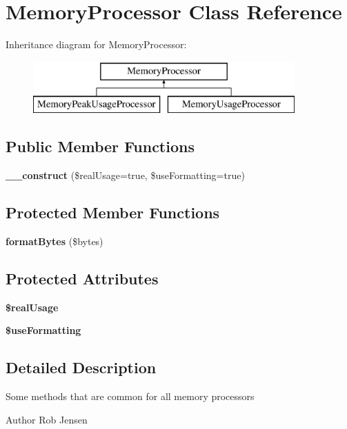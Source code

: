 \section{Memory\+Processor Class Reference}
\label{class_monolog_1_1_processor_1_1_memory_processor}
Inheritance diagram for Memory\+Processor\+:\begin{figure}[H]
\begin{center}
\leavevmode
\includegraphics[height=2.000000cm]{class_monolog_1_1_processor_1_1_memory_processor}
\end{center}
\end{figure}
\subsection*{Public Member Functions}
\begin{DoxyCompactItemize}
\item 
{\bf \+\_\+\+\_\+construct} (\$real\+Usage=true, \$use\+Formatting=true)
\end{DoxyCompactItemize}
\subsection*{Protected Member Functions}
\begin{DoxyCompactItemize}
\item 
{\bf format\+Bytes} (\$bytes)
\end{DoxyCompactItemize}
\subsection*{Protected Attributes}
\begin{DoxyCompactItemize}
\item 
{\bf \$real\+Usage}
\item 
{\bf \$use\+Formatting}
\end{DoxyCompactItemize}


\subsection{Detailed Description}
Some methods that are common for all memory processors

\begin{DoxyAuthor}{Author}
Rob Jensen 
\end{DoxyAuthor}


